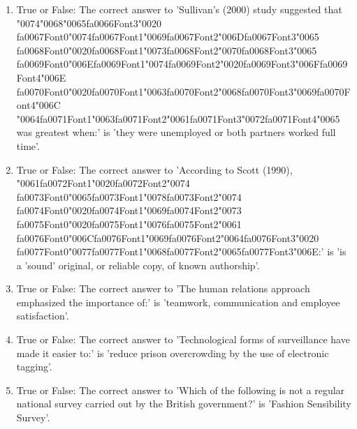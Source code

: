 \documentclass[12pt]{article}
\begin{document}
\begin{enumerate}[label=\arabic*.]
\item True or False: The correct answer to 'Sullivan's (2000) study suggested that {\char"0074}{\char"0068}{\char"0065}{\csname fa0066Font3\endcsname\char"0020} {\csname fa0067Font0\endcsname\char"0074}{\csname fa0067Font1\endcsname\char"0069}{\csname fa0067Font2\endcsname\char"006D}{\csname fa0067Font3\endcsname\char"0065} {\csname fa0068Font0\endcsname\char"0020}{\csname fa0068Font1\endcsname\char"0073}{\csname fa0068Font2\endcsname\char"0070}{\csname fa0068Font3\endcsname\char"0065} {\csname fa0069Font0\endcsname\char"006E}{\csname fa0069Font1\endcsname\char"0074}{\csname fa0069Font2\endcsname\char"0020}{\csname fa0069Font3\endcsname\char"006F}{\csname fa0069Font4\endcsname\char"006E} {\csname fa0070Font0\endcsname\char"0020}{\csname fa0070Font1\endcsname\char"0063}{\csname fa0070Font2\endcsname\char"0068}{\csname fa0070Font3\endcsname\char"0069}{\csname fa0070Font4\endcsname\char"006C} {\char"0064}{\csname fa0071Font1\endcsname\char"0063}{\csname fa0071Font2\endcsname\char"0061}{\csname fa0071Font3\endcsname\char"0072}{\csname fa0071Font4\endcsname\char"0065} was greatest when:' is 'they were unemployed or both partners worked full time'.
\item True or False: The correct answer to 'According to Scott (1990), {\char"0061}{\csname fa0072Font1\endcsname\char"0020}{\csname fa0072Font2\endcsname\char"0074} {\csname fa0073Font0\endcsname\char"0065}{\csname fa0073Font1\endcsname\char"0078}{\csname fa0073Font2\endcsname\char"0074} {\csname fa0074Font0\endcsname\char"0020}{\csname fa0074Font1\endcsname\char"0069}{\csname fa0074Font2\endcsname\char"0073} {\csname fa0075Font0\endcsname\char"0020}{\csname fa0075Font1\endcsname\char"0076}{\csname fa0075Font2\endcsname\char"0061} {\csname fa0076Font0\endcsname\char"006C}{\csname fa0076Font1\endcsname\char"0069}{\csname fa0076Font2\endcsname\char"0064}{\csname fa0076Font3\endcsname\char"0020} {\csname fa0077Font0\endcsname\char"0077}{\csname fa0077Font1\endcsname\char"0068}{\csname fa0077Font2\endcsname\char"0065}{\csname fa0077Font3\endcsname\char"006E}:' is 'is a 'sound' original, or reliable copy, of known authorship'.
\item True or False: The correct answer to 'The human relations approach emphasized the importance of:' is 'teamwork, communication and employee satisfaction'.
\item True or False: The correct answer to 'Technological forms of surveillance have made it easier to:' is 'reduce prison overcrowding by the use of electronic tagging'.
\item True or False: The correct answer to 'Which of the following is not a regular national survey carried out by the British government?' is 'Fashion Sensibility Survey'.

\end{enumerate}
\end{document}
